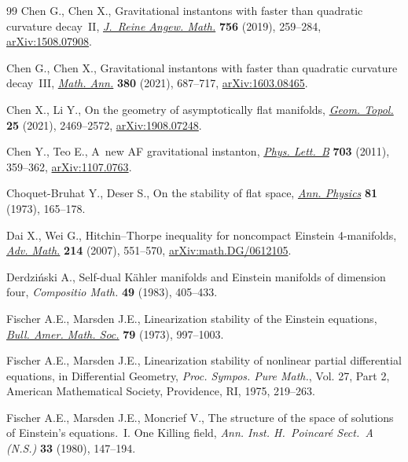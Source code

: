 \documentclass[pdftex]{sigma}
\numberwithin{equation}{section}
\begin{document}
\begin{thebibliography}{99}
Chen G., Chen X., Gravitational instantons with faster than quadratic curvature
 decay~{II}, \href{https://doi.org/10.1515/crelle-2017-0026}{\textit{J.~Reine Angew. Math.}} \textbf{756} (2019), 259--284,
 \href{https://arxiv.org/abs/1508.07908}{arXiv:1508.07908}.

Chen G., Chen X., Gravitational instantons with faster than quadratic curvature
 decay~{III}, \href{https://doi.org/10.1007/s00208-020-01984-9}{\textit{Math. Ann.}} \textbf{380} (2021), 687--717,
 \href{https://arxiv.org/abs/1603.08465}{arXiv:1603.08465}.

Chen X., Li Y., On the geometry of asymptotically flat manifolds, \href{https://doi.org/10.2140/gt.2021.25.2469}{\textit{Geom.
 Topol.}} \textbf{25} (2021), 2469--2572, \href{https://arxiv.org/abs/1908.07248}{arXiv:1908.07248}.

Chen Y., Teo E., A~new {AF} gravitational instanton, \href{https://doi.org/10.1016/j.physletb.2011.07.076}{\textit{Phys. Lett.~B}}
 \textbf{703} (2011), 359--362, \href{https://arxiv.org/abs/1107.0763}{arXiv:1107.0763}.

Choquet-Bruhat Y., Deser S., On the stability of flat space, \href{https://doi.org/10.1016/0003-4916(73)90484-3}{\textit{Ann.
 Physics}} \textbf{81} (1973), 165--178.

Dai X., Wei G., Hitchin--{T}horpe inequality for noncompact {E}instein
 4-manifolds, \href{https://doi.org/10.1016/j.aim.2007.02.010}{\textit{Adv. Math.}} \textbf{214} (2007), 551--570,
 \href{https://arxiv.org/abs/math.DG/0612105}{arXiv:math.DG/0612105}.

Derdzi\'nski A., Self-dual {K}\"ahler manifolds and {E}instein manifolds of
 dimension four, \textit{Compositio Math.} \textbf{49} (1983), 405--433.

Fischer A.E., Marsden J.E., Linearization stability of the {E}instein
 equations, \href{https://doi.org/10.1090/S0002-9904-1973-13299-9}{\textit{Bull. Amer. Math. Soc.}} \textbf{79} (1973), 997--1003.

Fischer A.E., Marsden J.E., Linearization stability of nonlinear partial
 differential equations, in Differential Geometry, \textit{Proc. Sympos. Pure Math.}, Vol. 27, Part 2, American
 Mathematical Society, Providence, RI, 1975, 219--263.

Fischer A.E., Marsden J.E., Moncrief V., The structure of the space of
 solutions of {E}instein's equations.~{I}. {O}ne {K}illing field, \textit{Ann.
 Inst. H.~Poincar\'e Sect.~A (N.S.)} \textbf{33} (1980), 147--194.


\end{thebibliography}
\end{document}
